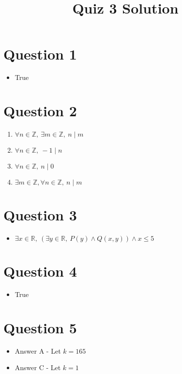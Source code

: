 \documentclass[12pt]{article}
\begin{document}
\title{Quiz 3 Solution}
\maketitle

\section*{Question 1}
\begin{itemize}
    \item True

\end{itemize}

\section*{Question 2}
\begin{enumerate}
    \item $\forall n \in \mathbb{Z},\: \exists m \in \mathbb{Z},\: n \mid m$
    \item $\forall n \in \mathbb{Z},\: -1 \mid n$
    \item $\forall n \in \mathbb{Z},\: n \mid 0$
    \item $\exists m \in \mathbb{Z}, \forall n \in \mathbb{Z},\: n \mid m$
\end{enumerate}

\section*{Question 3}
\begin{itemize}
    \item $\exists x \in \mathbb{R},\:(\exists y \in \mathbb{R},\:P(y) \land Q(x,y)) \land x \leq 5$
\end{itemize}

\section*{Question 4}
\begin{itemize}
    \item True
\end{itemize}

\section*{Question 5}
\begin{itemize}
    \item Answer A - Let $k = 165$
    \item Answer C - Let $k = 1$
\end{itemize}
\end{document}
